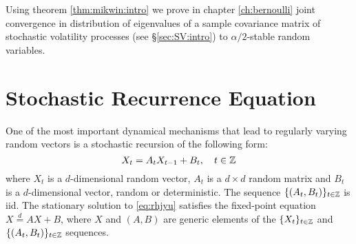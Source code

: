 Using theorem \ref{thm:mikwin:intro} we prove in chapter
\ref{ch:bernoulli} joint convergence in distribution of eigenvalues of
a sample covariance matrix of stochastic volatility processes (see
\S\ref{sec:SV:intro}) to $\alpha/2$-stable random variables.


\section{Stochastic Recurrence Equation}
\label{sec:tyhyjyt}
One of the most important dynamical mechanisms that lead to regularly
varying random vectors is a stochastic recursion of the following form:
\begin{equation}
  \label{eq:rhjyu}
  X_t = A_t X_{t-1} + B_t, \quad t \in \mathbb Z
\end{equation}
where $X_t$ is a $d$-dimensional random vector, $A_t$ is a $d\times d$
random matrix and $B_t$ is a $d$-dimensional vector, random or
deterministic. The sequence $\{(A_t, B_t)\}_{t \in \mathbb Z}$ is
iid. The stationary solution to \eqref{eq:rhjyu} satisfies the fixed-point
equation $X \overset{d}{=} A X + B$, where $X$ and $(A, B)$ are
generic elements of the $\{X_t\}_{t \in \mathbb Z}$ and
$\{(A_t, B_t)\}_{t \in \mathbb Z}$ sequences.


